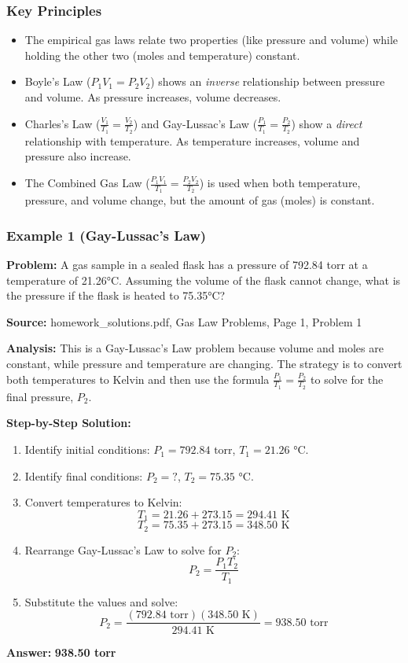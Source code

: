 \documentclass{article}
\begin{document}
\subsubsection{Key Principles}
\begin{itemize}
    \item The empirical gas laws relate two properties (like pressure and volume) while holding the other two (moles and temperature) constant.
    \item Boyle's Law ($P_1V_1 = P_2V_2$) shows an \textit{inverse} relationship between pressure and volume. As pressure increases, volume decreases.
    \item Charles's Law ($\frac{V_1}{T_1} = \frac{V_2}{T_2}$) and Gay-Lussac's Law ($\frac{P_1}{T_1} = \frac{P_2}{T_2}$) show a \textit{direct} relationship with temperature. As temperature increases, volume and pressure also increase.
    \item The Combined Gas Law ($\frac{P_1V_1}{T_1} = \frac{P_2V_2}{T_2}$) is used when both temperature, pressure, and volume change, but the amount of gas (moles) is constant.
\end{itemize}

\subsubsection{Example 1 (Gay-Lussac's Law)}
\textbf{Problem:} A gas sample in a sealed flask has a pressure of 792.84 torr at a temperature of 21.26°C. Assuming the volume of the flask cannot change, what is the pressure if the flask is heated to 75.35°C?

\textbf{Source:} homework\_solutions.pdf, Gas Law Problems, Page 1, Problem 1

\textbf{Analysis:} This is a Gay-Lussac's Law problem because volume and moles are constant, while pressure and temperature are changing. The strategy is to convert both temperatures to Kelvin and then use the formula $\frac{P_1}{T_1} = \frac{P_2}{T_2}$ to solve for the final pressure, $P_2$.

\textbf{Step-by-Step Solution:}
\begin{enumerate}
    \item Identify initial conditions: $P_1 = 792.84 \text{ torr}$, $T_1 = 21.26 \text{ °C}$.
    \item Identify final conditions: $P_2 = ?$, $T_2 = 75.35 \text{ °C}$.
    \item Convert temperatures to Kelvin:
    \[ T_1 = 21.26 + 273.15 = 294.41 \text{ K} \]
    \[ T_2 = 75.35 + 273.15 = 348.50 \text{ K} \]
    \item Rearrange Gay-Lussac's Law to solve for $P_2$:
    \[ P_2 = \frac{P_1 T_2}{T_1} \]
    \item Substitute the values and solve:
    \[ P_2 = \frac{(792.84 \text{ torr})(348.50 \text{ K})}{294.41 \text{ K}} = 938.50 \text{ torr} \]
\end{enumerate}
\textbf{Answer:} \textbf{938.50 torr}
\end{document}
